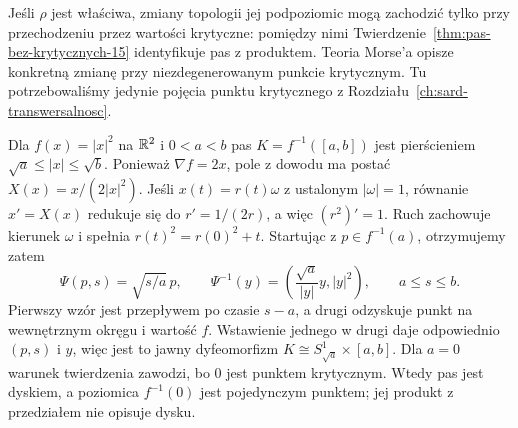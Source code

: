 \begin{uwaga}
Jeśli $\rho$ jest właściwa,
zmiany topologii jej podpoziomic
mogą zachodzić tylko przy
przechodzeniu przez wartości
krytyczne: pomiędzy nimi
Twierdzenie~\ref{thm:pas-bez-krytycznych-15}
identyfikuje pas z produktem.
Teoria Morse'a opisze
konkretną zmianę przy
niezdegenerowanym punkcie
krytycznym. Tu potrzebowaliśmy
jedynie pojęcia punktu
krytycznego z Rozdziału~\ref{ch:sard-transwersalnosc}.
\end{uwaga}

\par\smallskip
\begin{przyklad}
\label{prz:pas-pierscien-20}
Dla $f(x)=|x|^2$ na $\mathbb{R}^2$ i $0<a<b$ pas
$K=f^{-1}([a,b])$ jest pierścieniem
$\sqrt a\leq|x|\leq\sqrt b$.
Ponieważ $\nabla f=2x$, pole z dowodu ma postać
$X(x)=x/(2|x|^2)$.
Jeśli $x(t)=r(t)\omega$ z ustalonym $|\omega|=1$,
równanie $x'=X(x)$ redukuje się do
$r'=1/(2r)$, a więc $(r^2)'=1$.
Ruch zachowuje kierunek $\omega$ i spełnia
$r(t)^2=r(0)^2+t$.
Startując z $p\in f^{-1}(a)$, otrzymujemy zatem
\[
 \Psi(p,s)=\sqrt{s/a}\,p,\qquad
 \Psi^{-1}(y)=\left(\frac{\sqrt a}{|y|}y,|y|^2\right),
 \qquad a\leq s\leq b.
\]
Pierwszy wzór jest przepływem po czasie $s-a$,
a drugi odzyskuje punkt na wewnętrznym okręgu i wartość $f$.
Wstawienie jednego w drugi daje odpowiednio $(p,s)$ i $y$,
więc jest to jawny dyfeomorfizm
$K\cong S^1_{\sqrt a}\times[a,b]$.
Dla $a=0$ warunek twierdzenia zawodzi, bo $0$ jest punktem
krytycznym. Wtedy pas jest dyskiem, a poziomica $f^{-1}(0)$
jest pojedynczym punktem; jej produkt z przedziałem nie opisuje dysku.
\end{przyklad}

